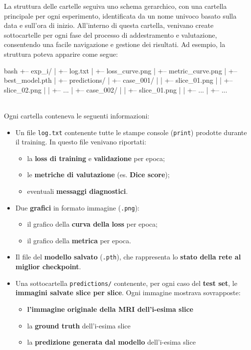 La struttura delle cartelle seguiva uno schema gerarchico, con una cartella principale per ogni esperimento, identificata da un nome univoco basato sulla data e sull'ora di inizio. All'interno di questa cartella, venivano create sottocartelle
per ogni fase del processo di addestramento e valutazione, consentendo una facile navigazione e gestione dei risultati. Ad esempio, la struttura poteva apparire come segue:\\
\begin{minipage}{\textwidth}
\begin{code}{bash}
+-- exp_i/
|   +-- log.txt
|   +-- loss_curve.png
|   +-- metric_curve.png
|   +-- best_model.pth
|   +-- predictions/
|       +-- case_001/
|       |   +-- slice_01.png
|       |   +-- slice_02.png
|       |   +-- ...
|       +-- case_002/
|       |   +-- slice_01.png
|       |   +-- ...
|       +-- ...
\end{code}
\end{minipage}
\\


Ogni cartella conteneva le seguenti informazioni:

\begin{itemize}
\item Un file \texttt{log.txt} contenente tutte le stampe console (\texttt{print}) prodotte durante il training. In questo file venivano riportati:
\begin{itemize}
\item la \textbf{loss di training} e \textbf{validazione} per epoca;
\item le \textbf{metriche di valutazione} (es. \textbf{Dice score});
\item eventuali \textbf{messaggi diagnostici}.
\end{itemize}
\item Due \textbf{grafici} in formato immagine (\texttt{.png}):
\begin{itemize}
    \item il grafico della \textbf{curva della loss} per epoca;
    \item il grafico della \textbf{metrica} per epoca.
\end{itemize}

\item Il file del \textbf{modello salvato} (\texttt{.pth}), che rappresenta lo \textbf{stato della rete al miglior checkpoint}.

\item Una sottocartella \texttt{predictions/} contenente, per ogni caso del \textbf{test set}, le \textbf{immagini salvate slice per slice}. Ogni immagine mostrava sovrapposte:
\begin{itemize}
    \item \textbf{l’immagine originale della MRI dell'i-esima slice}
    \item la \textbf{ground truth} dell'i-esima slice
    \item la \textbf{predizione generata dal modello} dell'i-esima slice
\end{itemize}

\end{itemize}

